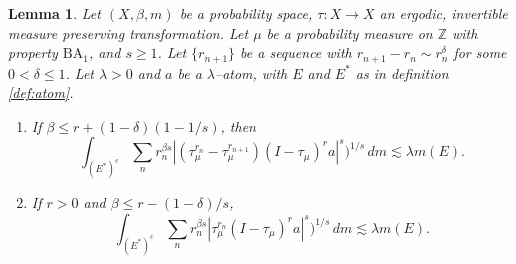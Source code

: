 \documentclass[11pt]{amsart}
\newtheorem{lemma}[thm]{Lemma}
\theoremstyle{definition}
\theoremstyle{remark}
\begin{document}
\begin{lemma}\label{lem:rn_weak} 
Let $(X,\beta,m)$ be a probability space, $\tau:X\to X$ an ergodic, invertible measure preserving transformation. 
Let $\mu$ be a probability measure on $\mathbb Z$ with property $\text{BA}_1$, and  $s\ge  1$.
Let $\{r_{n+1}\} $ be a sequence with $r_{n+1}-r_n\sim r_n^{\delta}$ for some $0<\delta \le 1$. 
Let $\lambda>0$ and $a$ be a $\lambda$--atom, with $E$ and $E^*$ as in definition \ref{def:atom}.
\begin{enumerate}
\item If $\beta\le r+(1-\delta )(1-1/s)$,
then 
\[ \int_{(E^*)^c} \sum_n r_n^{\beta s}|(\tau_{\mu}^{r_n}-\tau_{\mu}^{r_{n+1}})(I-\tau_{\mu})^r a|^s)^{1/s}\, dm
\lesssim \lambda m(E).
\]
\item If $r>0$ and $\beta\le r-(1-\delta )/s$, 
\[ \int_{(E^*)^c} \sum_n r_n^{\beta s} |\tau_{\mu}^{r_n}(I-\tau_{\mu})^r a|^s)^{1/s}\, dm
\lesssim \lambda m(E).\]
\end{enumerate}
\end{lemma}
\end{document}
